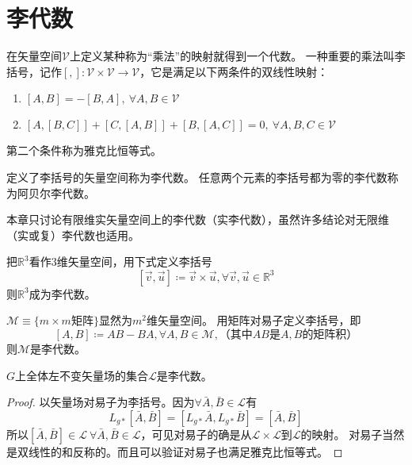 \section{李代数}

在矢量空间$\mathscr{V}$上定义某种称为``乘法''的映射就得到一个代数。
一种重要的乘法叫李括号，记作$[,] \colon \mathscr{V} \times \mathscr{V} \to \mathscr{V}$，它是满足以下两条件的双线性映射：
\begin{enumerate}[（a）]
    \item $[A, B] = -[B, A], ~ \forall A, B \in \mathscr{V}$
    \item $[A, [B, C]] + [C, [A, B]] + [B, [A, C]] = 0, ~ \forall A, B, C \in \mathscr{V}$
\end{enumerate}
第二个条件称为雅克比恒等式。

\begin{definition}
    定义了李括号的矢量空间称为李代数。
    任意两个元素的李括号都为零的李代数称为阿贝尔李代数。
\end{definition}

本章只讨论有限维实矢量空间上的李代数（实李代数），虽然许多结论对无限维（实或复）李代数也适用。

\begin{example}
    把$\mathbb{R}^3$看作$3$维矢量空间，用下式定义李括号
    $$[\vec v, \vec u] \coloneq \vec v \times \vec u, \forall \vec v, \vec u \in \mathbb{R}^3$$
    则$\mathbb{R}^3$成为李代数。
\end{example}

\begin{example}
    $\mathscr{M} \equiv \{m \times m \text{矩阵}\}$显然为$m^2$维矢量空间。
    用矩阵对易子定义李括号，即
    $$[A, B] \coloneq AB - BA, \forall A, B \in \mathscr{M}, \text{（其中$AB$是$A, B$的矩阵积）}$$
    则$\mathscr{M}$是李代数。
\end{example}

\begin{theorem}
    $G$上全体左不变矢量场的集合$\mathscr{L}$是李代数。
\end{theorem}

\begin{proof}
    以矢量场对易子为李括号。因为$\forall \bar A, \bar B \in \mathscr{L}$有
    $$L_{g*}[\bar A, \bar B] = [L_{g*}\bar A, L_{g*}\bar B] = [\bar A, \bar B]$$
    所以$[\bar A, \bar B] \in \mathscr{L} ~ \forall \bar A, \bar B \in \mathscr{L}$，可见对易子的确是从$\mathscr{L} \times \mathscr{L}$到$\mathscr{L}$的映射。
    对易子当然是双线性的和反称的。而且可以验证对易子也满足雅克比恒等式。
\end{proof}

